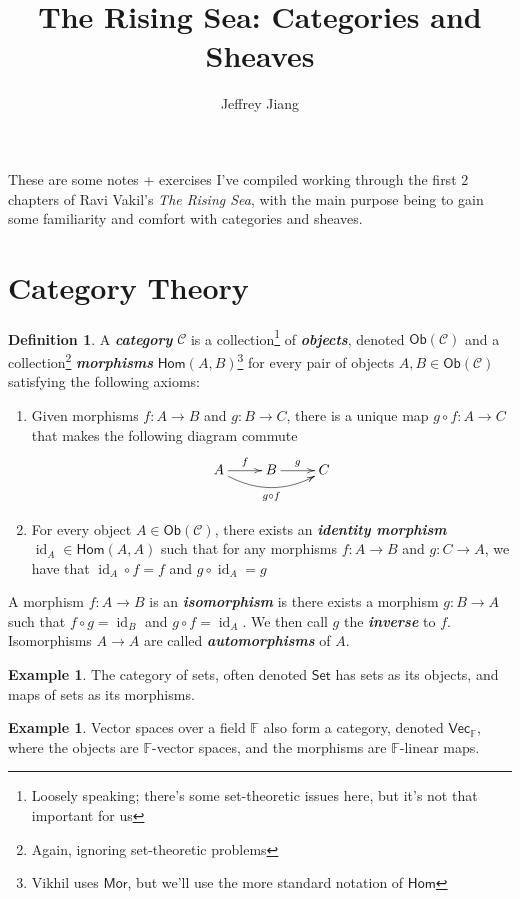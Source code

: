 \documentclass[psamsfonts]{amsart}
\theoremstyle{definition}
\newtheorem{defn}[thm]{Definition}
\newtheorem{exmp}[thm]{Example}
\theoremstyle{remark}
\renewcommand{\hom}{\mathsf{Hom}}
\newcommand{\ib}[1]{\textbf{\textit{#1}}}
\newcommand{\F}{\mathbb{F}}
\DeclareMathOperator{\id}{id}
\begin{document}
\author{Jeffrey Jiang}
\title{The Rising Sea: Categories and Sheaves}
\maketitle

These are some notes + exercises I've compiled working through the first $2$ chapters of Ravi Vakil's \emph{The Rising Sea}, with the main purpose being to gain some familiarity and comfort with categories and sheaves.
%
\section{Category Theory}
%
\begin{defn}
A \ib{category} $\mathscr{C}$ is a collection\footnote{Loosely speaking; there's some set-theoretic issues here, but it's not that important for us} of \ib{objects}, denoted $\mathsf{Ob}(\mathscr{C})$ and a collection\footnote{Again, ignoring set-theoretic problems} \ib{morphisms} $\hom(A,B)$\footnote{Vikhil uses $\mathsf{Mor}$, but we'll use the more standard notation of $\hom$} for every pair of objects $A,B \in \mathsf{Ob}(\mathscr{C})$ satisfying the following axioms:
\begin{enumerate}
\item Given morphisms $f: A \to B$ and $g: B \to C$, there is a unique map $g \circ f: A \to C$ that makes the following diagram commute
$$\xymatrix{
A \ar@/_1pc/[rr]_{g \circ f}\ar[r]^f & B \ar[r]^g & C
}$$
\item For every object $A \in \mathsf{Ob}(\mathscr{C})$, there exists an \ib{identity morphism} $\id_A \in \hom(A,A)$ such that for any morphisms $f: A \to B$ and $g: C \to A$, we have that $\id_A \circ f = f$ and $g \circ \id_A = g$
\end{enumerate}
A morphism $f: A \to B$ is an \ib{isomorphism} is there exists a morphism $g: B \to A$ such that $f \circ g = \id_B$ and $g \circ f = \id_A$. We then call $g$ the \ib{inverse} to $f$. Isomorphisms $A \to A$ are called \ib{automorphisms} of $A$.
\end{defn}
%
\begin{exmp}
The category of sets, often denoted $\mathsf{Set}$ has sets as its objects, and maps of sets as its morphisms.
\end{exmp}
%
\begin{exmp}
Vector spaces over a field $\F$ also form a category, denoted $\mathsf{Vec}_\F$, where the objects are $\F$-vector spaces, and the morphisms are $\F$-linear maps.
\end{exmp}
\end{document}
